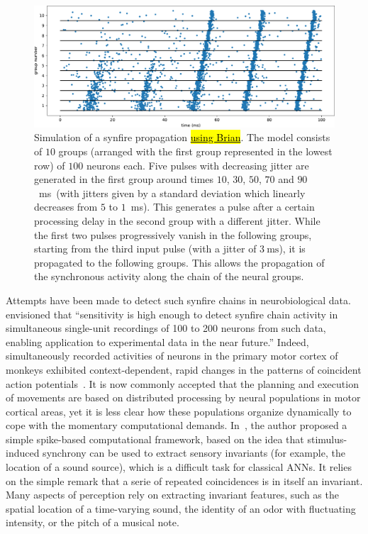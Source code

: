 \documentclass[brainsci, %
               review,accept,pdftex,moreauthors
               ]{Definitions/mdpi}
\newcommand{\ms}{\si{\milli\second}}%
\begin{document}
\begin{figure}[H]
\includegraphics[width=\textwidth]{figures/Diesmann_et_al_1999.pdf}
\caption{
  Simulation of a synfire propagation \href{https://brian2.readthedocs.io/en/stable/examples/frompapers.Diesmann_et_al_1999.html}{\hl{using Brian}}.
  The model consists of $10$ groups (arranged with the first group represented in the lowest row) of $100$ neurons each. Five pulses with decreasing jitter are generated in the first group around times $10$, $30$, $50$, $70$ and $90$~\ms~(with jitters given by a standard deviation which linearly decreases from $5$ to $1$~\ms). This generates a pulse after a certain processing delay in the second group with a different jitter. While the first two pulses progressively vanish in the following groups, starting from the third input pulse (with a jitter of $3~\ms$), it is propagated to the following groups. This allows the propagation of the synchronous activity along the chain of the neural groups.}\label{fig:diesman}
\end{figure}

Attempts have been made to detect such synfire chains in neurobiological data. \citet{schrader_detecting_2008} envisioned that ``sensitivity is high enough to detect synfire chain activity in simultaneous single-unit recordings of 100 to 200 neurons from such data, enabling application to experimental data in the near future.'' Indeed, simultaneously recorded activities of neurons in the primary motor cortex of monkeys exhibited context-dependent, rapid changes in the patterns of coincident action potentials~\citep{riehle_spike_1997,grammont_precise_1999}. It is now commonly accepted that the planning and execution of movements are based on distributed processing by neural populations in motor cortical areas, yet it is less clear  how these populations organize dynamically to cope with the momentary computational demands.  In~\citep{brette_computing_2012}, the author proposed a simple spike-based computational framework, based on the idea that stimulus-induced synchrony can be used to extract sensory invariants (for example, the location of a sound source), which is a difficult task for classical ANNs. It relies on the simple remark that a serie of repeated coincidences is in itself an invariant. Many aspects of perception rely on extracting invariant features, such as the spatial location of a time-varying sound, the identity of an odor with fluctuating intensity, or the pitch of a musical note.
\end{document}
